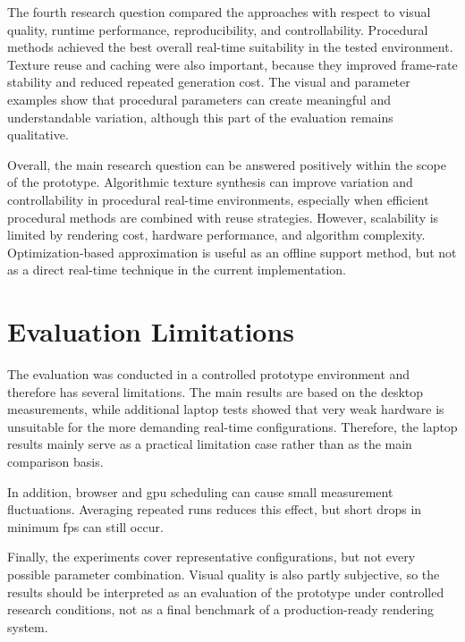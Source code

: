 The fourth research question compared the approaches with respect to visual quality, runtime performance, reproducibility, and controllability. Procedural methods achieved the best overall real-time suitability in the tested environment. Texture reuse and caching were also important, because they improved frame-rate stability and reduced repeated generation cost. The visual and parameter examples show that procedural parameters can create meaningful and understandable variation, although this part of the evaluation remains qualitative.

Overall, the main research question can be answered positively within the scope of the prototype. Algorithmic texture synthesis can improve variation and controllability in procedural real-time environments, especially when efficient procedural methods are combined with reuse strategies. However, scalability is limited by rendering cost, hardware performance, and algorithm complexity. Optimization-based approximation is useful as an offline support method, but not as a direct real-time technique in the current implementation.

\section{Evaluation Limitations}

The evaluation was conducted in a controlled prototype environment and therefore has several limitations. The main results are based on the desktop measurements, while additional laptop tests showed that very weak hardware is unsuitable for the more demanding real-time configurations. Therefore, the laptop results mainly serve as a practical limitation case rather than as the main comparison basis.

In addition, browser and \gls{gpu} scheduling can cause small measurement fluctuations. Averaging repeated runs reduces this effect, but short drops in minimum \gls{fps} can still occur.

Finally, the experiments cover representative configurations, but not every possible parameter combination. Visual quality is also partly subjective, so the results should be interpreted as an evaluation of the prototype under controlled research conditions, not as a final benchmark of a production-ready rendering system.